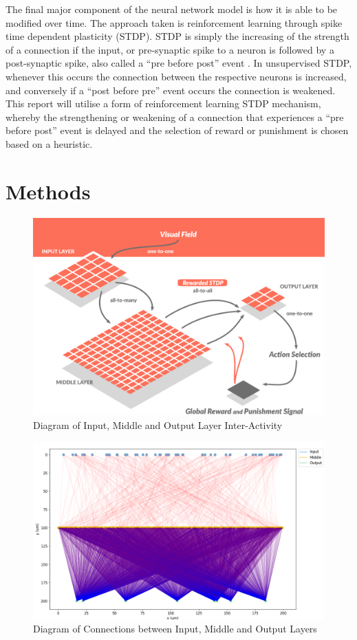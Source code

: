 \documentclass[11pt, twocolumn]{article}
\begin{document}
The final major component of the neural network model is how it is able to be modified over time. The approach taken is reinforcement learning through spike time dependent plasticity (\acs{STDP}). \acs{STDP} is simply the increasing of the strength of a connection if the input, or pre-synaptic spike to a neuron is followed by a post-synaptic spike, also called a ``pre before post'' event \cite{sanda2017multi}. In unsupervised \acs{STDP}, whenever this occurs the connection between the respective neurons is increased, and conversely if a ``post before pre'' event occurs the connection is weakened. This report will utilise a form of reinforcement learning \acs{STDP} mechanism, whereby the strengthening or weakening of a connection that experiences a ``pre before post'' event is delayed and the selection of reward or punishment is chosen based on a heuristic.

\section*{Methods}
\vspace{-3mm}
\begin{figure}[H]
	\centering
	\includegraphics[width=\linewidth]{layers_diagram}
	\caption{Diagram of Input, Middle and Output Layer Inter-Activity \cite{sanda2017multi}}
	\label{fig:layers_diagram}
\end{figure}
\begin{figure}[H]
	\centering
	\includegraphics[width=\linewidth]{network_connections}
	\caption{Diagram of Connections between Input, Middle and Output Layers}
	\label{fig:network_connections}
\end{figure}
\end{document}
